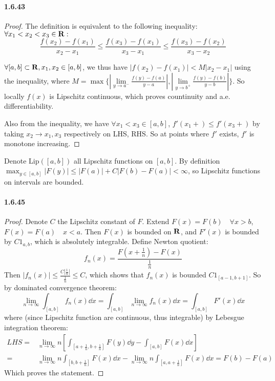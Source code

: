 \documentclass{article}
\begin{document}
\paragraph{1.6.43}
\begin{proof}
The definition is equivalent to the following inequality: $\forall x_1<x_2<x_3\in \mathbf{R}:$
\[\frac{f(x_2)-f(x_1)}{x_2-x_1}\leq \frac{f(x_3)-f(x_1)}{x_3-x_1}\leq \frac{f(x_3)-f(x_2)}{x_3-x_2}\]

$\forall [a,b]\subset \mathbf{R},x_1,x_2\in [a,b]$, we thus have $|f(x_2)-f(x_1)|<M|x_2-x_1|$ using the inequality, where $M=\max\{|\lim\limits_{y\to a^-}\frac{f(y)-f(a)}{y-a}|,|\lim\limits_{y\to b^+}\frac{f(y)-f(b)}{y-b}|\}$. So locally $f(x)$ is Lipschitz continuous, which proves countinuity and a.e. differentiability.

Also from the inequality, we have $\forall x_1<x_3\in [a,b]$, $f'(x_1+)\leq f'(x_3+)$ by taking $x_2\to x_1,x_3$ respectively on LHS, RHS. So at points where $f'$ exists, $f'$ is monotone increasing.

\end{proof}


\newcommand{\lip}{\mathrm{Lip}}
Denote $\lip([a,b])$ all Lipschitz functions on $[a,b]$. By definition $\max_{y\in [a,b]}|F(y)|\leq |F(a)|+C|F(b)-F(a)|<\infty$, so Lipschitz functions on intervals are bounded.
\paragraph{1.6.45}
\begin{proof}
Denote $C$ the Lipschitz constant of $F$. Extend $F(x)=F(b)\quad \forall x>b$, $F(x)=F(a)\quad x<a$. Then $F(x)$ is bounded on $\mathbf{R}$, and $F'(x)$ is bounded by $C1_{a,b}$, which is absolutely integrable. Define Newton quotient:
\[f_n(x)=\frac{F(x+\frac{1}{n})-F(x)}{\frac{1}{n}}\]
Then $|f_n(x)|\leq \frac{C|\frac{1}{n}|}{\frac{1}{n}}\leq C$, which shows that $f_n(x)$ is bounded $C1_{[a-1,b+1]}$. So by dominated convergence theorem:
\[\lim_{n\to\infty}\int_{[a,b]}f_n(x)\dd x=\int_{[a,b]}\lim_{n\to\infty}f_n(x)\dd x=\int_{[a,b]}F'(x)\dd x\]
where (since Lipschitz function are continuous, thus integrable) by Lebesgue integration theorem:
\[\begin{aligned}
LHS=&\lim_{n\to\infty}n[\int_{[a+\frac 1 n,b+\frac{1}{n}]}F(y)\dd y-\int_{[a,b]}F(x)\dd x]\\
=&\lim_{n\to\infty}n\int_{[b,b+\frac 1 n]}F(x)\dd x-\lim_{n\to\infty} n\int_{[a,a+\frac 1 n]}F(x)\dd x
=F(b)-F(a)\end{aligned}\]
Which proves the statement.
\end{proof}
\end{document}
